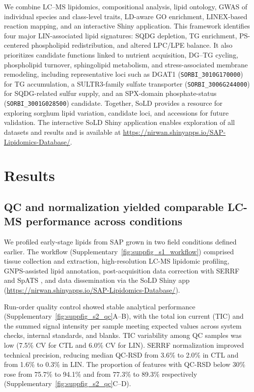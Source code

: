 \documentclass[9pt,twocolumn,twoside]{rilabRxiv}
\begin{document}
We combine LC--MS lipidomics, compositional analysis, lipid ontology, GWAS of individual species and class-level traits, LD-aware GO enrichment, LINEX-based reaction mapping, and an interactive Shiny application. This framework identifies four major LIN-associated lipid signatures: SQDG depletion, TG enrichment, PS-centered phospholipid redistribution, and altered LPC/LPE balance. It also prioritizes candidate functions linked to nutrient acquisition, DG--TG cycling, phospholipid turnover, sphingolipid metabolism, and stress-associated membrane remodeling, including representative loci such as DGAT1 (\texttt{SORBI\_3010G170000}) for TG accumulation, a SULTR3-family sulfate transporter (\texttt{SORBI\_3006G244000}) for SQDG-related sulfur supply, and an SPX-domain phosphate-status (\texttt{SORBI\_3001G028500}) candidate. Together, SoLD provides a resource for exploring sorghum lipid variation, candidate loci, and accessions for future validation. The interactive SoLD Shiny application enables exploration of all datasets and results and is available at \url{https://nirwan.shinyapps.io/SAP-Lipidomics-Database/}.

\section{Results}

\subsection*{QC and normalization yielded comparable LC-MS performance across conditions}

We profiled early-stage lipids from SAP grown in two field conditions defined earlier. The workflow (Supplementary~\ref{fig:suppfig_s1_workflow}) comprised tissue collection and extraction, high-resolution LC-MS lipidomic profiling, GNPS-assisted lipid annotation, post-acquisition data correction with SERRF and SpATS \citep{Fan2019, RodriguezAlvarez2018}, and data dissemination via the SoLD Shiny app (\url{https://nirwan.shinyapps.io/SAP-Lipidomics-Database/}).

Run-order quality control showed stable analytical performance (Supplementary~\ref{fig:suppfig_s2_qc}A--B), with the total ion current (TIC) and the summed signal intensity per sample meeting expected values across system checks, internal standards, and blanks. TIC variability among QC samples was low (7.5\% CV for CTL and 6.0\% CV for LIN). SERRF normalization improved technical precision, reducing median QC-RSD from 3.6\% to 2.0\% in CTL and from 1.6\% to 0.3\% in LIN. The proportion of features with QC-RSD below 30\% rose from 75.7\% to 94.1\% and from 77.3\% to 89.3\% respectively (Supplementary~\ref{fig:suppfig_s2_qc}C--D).
\end{document}
